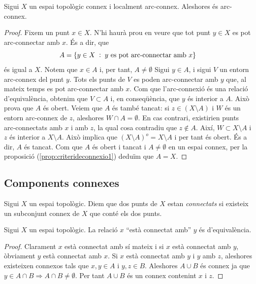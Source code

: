 \documentclass[../main.tex]{subfiles}
\begin{document}
\begin{prop}
\label{prop:conneximplicaarcconnex2} Sigui $X$ un espai topològic connex i localment arc-connex. Aleshores és arc-connex.
\end{prop}
\begin{proof}
Fixem un punt $x\in X$. N'hi haurà prou en veure que tot punt $y\in X$ es pot arc-connectar amb $x$. És a dir, que 
\begin{equation}
    \notag
    A = \{y\in X\;:\;\text{$y$ es pot arc-connectar amb $x$}\}
\end{equation}
és igual a $X$. Notem que $x\in A$ i, per tant, $A\not=\emptyset$ Sigui $y\in A$, i sigui $V$ un entorn arc-connex del punt $y$. Tots els punts de $V$ es poden arc-connectar amb $y$ que, al mateix temps es pot arc-connectar amb $x$. Com que l'arc-connexió és una relació d'equivalència, obtenim que $V\subset A$ i, en conseqüència, que $y$ és interior a $A$. Això prova que $A$ és obert. Veiem que $A$ és també tancat: si $z\in (X\setminus A)$ i $W$ és un entorn arc-connex de $z$, aleshores $W\cap A=\emptyset$. En cas contrari, existirien punts arc-connectats amb $x$ i amb $z$, la qual cosa contradiu que $z\not\in A$. Així, $W\subset X\setminus A$ i $z$ és interior a $X\setminus A$. Això implica que $(X\setminus A)^{o} = X\setminus A$ i per tant és obert. És a dir, $A$ és tancat. Com que $A$ és obert i tancat i $A\not=\emptyset$ en un espai connex, per la proposició (\ref{prop:criterideconnexio1}) deduïm que $A = X$.
\end{proof}

\subsection{Components connexes}

\begin{defi}[Connectats]
\label{def:connectats} Sigui $X$ un espai topològic. Diem que dos punts de $X$ estan \textit{connectats} si existeix un subconjunt connex de $X$ que conté els dos punts.
\end{defi}

\begin{prop}
\label{prop:relacioconnexio} Sigui $X$ un espai topològic. La relació $x$ ``està connectat amb'' $y$ és d'equivalència.
\end{prop}
\begin{proof}
Clarament $x$ està connectat amb sí mateix i si $x$ està connectat amb $y$, òbviament $y$ està connectat amb $x$. Si $x$ està connectat amb $y$ i $y$ amb $z$, aleshores existeixen connexos tals que $x,y\in A$ i $y,z\in B$. Aleshores $A\cup B$ és connex ja que $y\in A\cap B\Rightarrow A\cap B\not=\emptyset$. Per tant $A\cup B$ és un connex contenint $x$ i $z$.
\end{proof}
\end{document}
